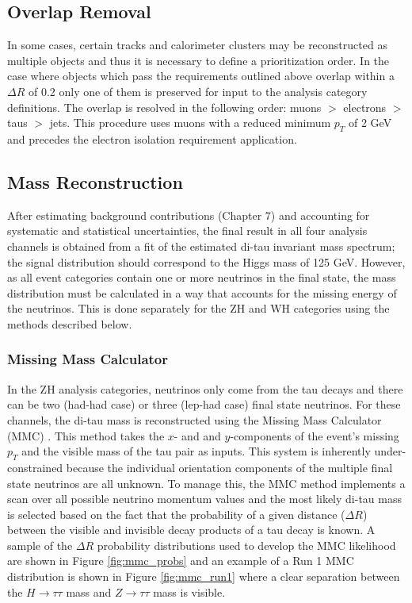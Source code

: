 \subsection{Overlap Removal}\label{sec:overlap}
In some cases, certain tracks and calorimeter clusters may be reconstructed as multiple objects and thus it is necessary to define a prioritization order. In the case where objects which pass the requirements outlined above overlap within a $\Delta R$ of 0.2 only one of them is preserved for input to the analysis category definitions. The overlap is resolved in the following order: muons $>$ electrons $>$ taus $>$ jets. This procedure uses muons with a reduced minimum $p_T$ of 2 GeV and precedes the electron isolation requirement application.

\subsection{Mass Reconstruction}
After estimating background contributions (Chapter 7) and accounting for systematic and statistical uncertainties, the final result in all four analysis channels is obtained from a fit of the estimated di-tau invariant mass spectrum; the signal distribution should correspond to the Higgs mass of 125 GeV. However, as all event categories contain one or more neutrinos in the final state, the mass distribution must be calculated in a way that accounts for the missing energy of the neutrinos. This is done separately for the ZH and WH categories using the methods described below.

\subsubsection{Missing Mass Calculator}\label{sec:mass_recon}
In the ZH analysis categories, neutrinos only come from the tau decays and there can be two (had-had case) or three (lep-had case) final state neutrinos. For these channels, the di-tau mass is reconstructed using the Missing Mass Calculator (MMC) \cite{mmc}. This method takes the $x$- and  and $y$-components of the event's missing $p_T$ and the visible mass of the tau pair as inputs. This system is inherently under-constrained because the individual orientation components of the multiple final state neutrinos are all unknown. To manage this, the MMC method implements a scan over all possible neutrino momentum values and the most likely di-tau mass is selected based on the fact that the probability of a given distance ($\Delta R$) between the visible and invisible decay products of a tau decay is known. A sample of the $\Delta R$ probability distributions used to develop the MMC likelihood are shown in Figure \ref{fig:mmc_probs} and an example of a Run 1 MMC distribution is shown in Figure \ref{fig:mmc_run1} where a clear separation between the $H\rightarrow \tau\tau$ mass and $Z\rightarrow\tau\tau$ mass is visible. 

